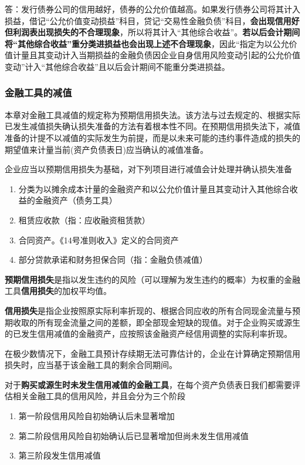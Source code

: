 \documentclass[UTF8,12pt]{ctexart}
\numberwithin{equation}{section} %
\numberwithin{figure}{section}
\numberwithin{table}{section}
\begin{document}
	答：发行债券公司的信用越好，债券的公允价值越高。如果发行债券公司将其计入损益，借记“公允价值变动损益”科目，贷记“交易性金融负债”科目，\textbf{会出现信用好但利润表出现损失的不合理现象}，所以将其计入“其他综合收益”。\textbf{若以后会计期间将“其他综合收益”重分类进损益也会出现上述不合理现象}，因此“指定为以公允价值计量且其变动计入当期损益的金融负债因企业自身信用风险变动引起的公允价值变动”计入“其他综合收益”且以后会计期间不能重分类进损益。
	
	\subsubsection{金融工具的减值}
	本章对金融工具减值的规定称为预期信用损失法。该方法与过去规定的、根据实际已发生减值损失确认损失准备的方法有着根本性不同。在预期信用损失法下，减值准备的计提不以减值的实际发生为前提，而是以未来可能的违约事件造成的损失的期望值来计量当前(资产负债表日)应当确认的减值准备。
	
	企业应当以预期信用损失为基础，对下列项目进行减值会计处理并确认损失准备
	\begin{enumerate}
		\item 分类为以摊余成本计量的金融资产和以公允价值计量且其变动计入其他综合收益的金融资产（债务工具）
		
		\item 租赁应收款（指：应收融资租赁款）
		
		\item 合同资产。《14号准则收入》定义的合同资产
		
		\item 部分贷款承诺和财务担保合同（指：金融负债减值）
	\end{enumerate}
	
	\textbf{预期信用损失}是指以发生违约的风险（可以理解为发生违约的概率）为权重的金融工具\textbf{信用损失}的加权平均值。
	
	\textbf{信用损失}是指企业按照原实际利率折现的、根据合同应收的所有合同现金流量与预期收取的所有现金流量之间的差额，即全部现金短缺的现值。对于企业购买或源生的已发生信用减值的金融资产，应按照该金融资产经信用调整的实际利率折现。
	
	在极少数情况下，金融工具预计存续期无法可靠估计的，企业在计算确定预期信用损失时，应当基于该金融工具的剩余合同期间。
	
	对于\textbf{购买或源生时未发生信用减值的金融工具}，在每个资产负债表日我们都需要评估相关金融工具的信用风险，并且会分为三个阶段
	\begin{enumerate}
		\item 第一阶段信用风险自初始确认后未显著增加
		
		\item 第二阶段信用风险自初始确认后已显著增加但尚未发生信用减值
		
		\item 第三阶段发生信用减值
	\end{enumerate}
	
\end{document}

